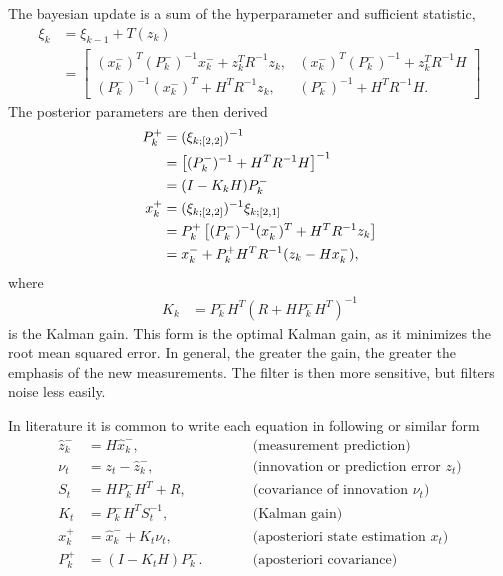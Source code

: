 The bayesian update is a sum of the hyperparameter and sufficient statistic,
\begin{align}
    \xi_{k}
    &= \xi_{k-1} +  T(z_{k})  \nonumber \\
    &=
    \begin{bmatrix}
    (x_{k}^{-})^{T} (P_{k}^{-})^{-1} x_{k}^{-} + z_{k}^{T} R^{-1} z_{k},
    & (x_{k}^{-})^{T} (P_{k}^{-})^{-1} + z_{k}^{T} R^{-1} H \\
    (P_{k}^{-})^{-1} (x_{k}^{-})^{T} + H^{T} R^{-1} z_{k},
    & (P_{k}^{-})^{-1} + H^{T} R^{-1} H.
    \end{bmatrix}
\end{align}
The posterior parameters are then derived
\begin{align}
    P_{k}^{+} &= (\xi_{k;[2,2]})^{-1} \notag\\
    &= \left[ (P_{k}^{-})^{-1} + H^{T} R^{-1} H \right]^{-1} \notag\\
    &= (I - K_{k} H) P_{k}^{-} \\
    x_{k}^{+} &= (\xi_{k;[2,2]})^{-1} \xi_{k;[2,1]} \notag\\
    &= P_{k}^{+} \left[ (P_{k}^{-})^{-1} (x_{k}^{-})^{T} + H^{T} R^{-1} z_{k}\right] \notag \\
    &= x_{k}^{-} + P_{k}^{+} H^{T} R^{-1}(z_{k} - Hx_{k}^{-}),
\end{align}
where
\begin{align}
    K_{k} &= P_{k}^{-} H^{T}(R + H P_{k}^{-}H^{T})^{-1} \label{eq:kalman_gain}
\end{align}
is the Kalman gain. This form is the optimal Kalman gain, as it minimizes the root mean squared error. In general, the
greater the gain, the greater the emphasis of the new measurements. The filter is then more sensitive, but filters noise less easily.

In literature it is common to write each equation in following or similar form
\begin{align}
    \hat{z}_{k}^{-} &= H \hat{x}_{k}^{-}, \qquad &&\text{(measurement prediction)} \\
    \nu_t &= z_t - \hat{z}_{k}^{-}, \qquad &&\text{(innovation or prediction error $z_t$)} \\
    S_t &= H P_{k}^{-} H^T + R, \qquad &&\text{(covariance of innovation $\nu_t$)} \\
    K_t &= P_{k}^{-} H^T S_t^{-1}, \qquad &&\text{(Kalman gain)} \\
    {x}_{k}^{+} &= \hat{x}_{k}^{-} + K_t \nu_t, \qquad &&\text{(aposteriori state estimation $x_t$)} \\
    P_{k}^{+} &= (I - K_t H) P_{k}^{-}. \qquad &&\text{(aposteriori covariance)}
\end{align}

